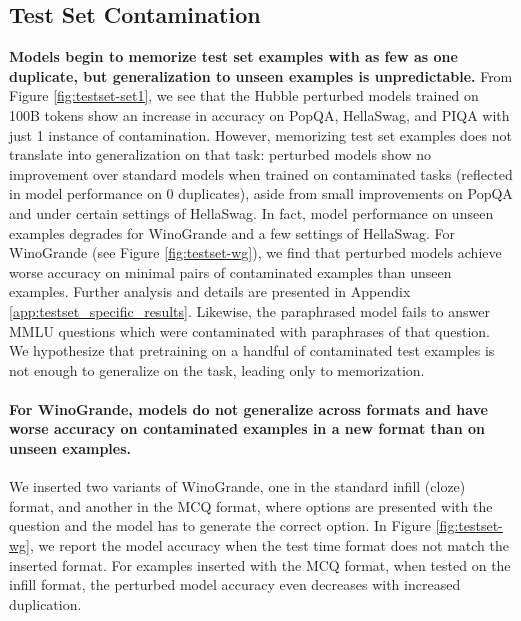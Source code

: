 \documentclass{article} %
\begin{document}
\subsection{Test Set Contamination}

\textbf{Models begin to memorize test set examples with as few as one duplicate, but generalization to unseen examples is unpredictable.} From Figure \ref{fig:testset-set1}, we see that the Hubble perturbed models trained on 100B tokens show an increase in accuracy on PopQA, HellaSwag, and PIQA with just 1 instance of contamination.
However, memorizing test set examples does not translate into generalization on that task: perturbed models show no improvement over standard models when trained on contaminated tasks (reflected in model performance on 0 duplicates), aside from small improvements on PopQA and under certain settings of HellaSwag. In fact, model performance on unseen examples degrades for WinoGrande and a few settings of HellaSwag.
For WinoGrande (see Figure \ref{fig:testset-wg}), we find that perturbed models achieve worse accuracy on minimal pairs of contaminated examples than unseen examples. Further analysis and details are presented in Appendix \ref{app:testset_specific_results}.
Likewise, the paraphrased model fails to answer MMLU questions which were contaminated with paraphrases of that question. We hypothesize that pretraining on a handful of contaminated test examples is not enough to generalize on the task, leading only to memorization.

\paragraph{For WinoGrande, models do not generalize across formats and have worse accuracy on contaminated examples in a new format than on unseen examples.} We inserted two variants of WinoGrande, one in the standard infill (cloze) format, and another in the MCQ format, where options are presented with the question and the model has to generate the correct option. In Figure \ref{fig:testset-wg}, we report the model accuracy when the test time format does not match the inserted format. For examples inserted with the MCQ format, when tested on the infill format, the perturbed model accuracy even decreases with increased duplication.
\end{document}
